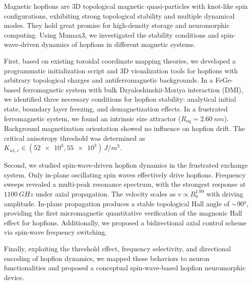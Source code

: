 \documentclass[UTF8, a4paper, zihao=-4, fontset=fandol, openany, oneside]{ctexbook}
\begin{document}
\thispagestyle{romanfront}

\begin{enabstract}
Magnetic hopfions are 3D topological magnetic quasi-particles with knot-like spin configurations, exhibiting strong topological stability and multiple dynamical modes. They hold great promise for high-density storage and neuromorphic computing. Using Mumax3, we investigated the stability conditions and spin-wave-driven dynamics of hopfions in different magnetic systems.

First, based on existing toroidal coordinate mapping theories, we developed a programmatic initialization script and 3D visualization tools for hopfions with arbitrary topological charges and antiferromagnetic backgrounds. In a FeGe-based ferromagnetic system with bulk Dzyaloshinskii-Moriya interaction (DMI), we identified three necessary conditions for hopfion stability: analytical initial state, boundary layer freezing, and demagnetization effects. In a frustrated ferromagnetic system, we found an intrinsic size attractor ($R_{\text{eq}} = \SI{2.60}{nm}$). Background magnetization orientation showed no influence on hopfion drift. The critical anisotropy threshold was determined as $K_{u1,c} \in (\num{52e3}, \num{55e3}) \, \si{J/m^3}$.

Second, we studied spin-wave-driven hopfion dynamics in the frustrated exchange system. Only in-plane oscillating spin waves effectively drive hopfions. Frequency sweeps revealed a multi-peak resonance spectrum, with the strongest response at $\SI{1100}{GHz}$ under axial propagation. The velocity scales as $v \propto B_0^{1.99}$ with driving amplitude. In-plane propagation produces a stable topological Hall angle of $\sim 90°$, providing the first micromagnetic quantitative verification of the magnonic Hall effect for hopfions. Additionally, we proposed a bidirectional axial control scheme via spin-wave frequency switching.

Finally, exploiting the threshold effect, frequency selectivity, and directional encoding of hopfion dynamics, we mapped these behaviors to neuron functionalities and proposed a conceptual spin-wave-based hopfion neuromorphic device.

\end{enabstract}
\end{document}
